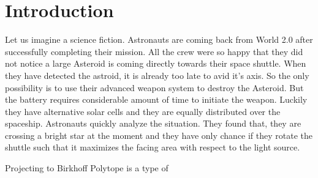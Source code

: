 
\chapter{Introduction} %

\label{ChapterX} %


Let us imagine a science fiction. Astronauts are coming back from World 2.0 after successfully completing their mission. All the crew were so happy that they did not notice a large Asteroid is coming directly towards their space shuttle. When they have detected the astroid, it is already too late to avid it's axis. So the only possibility is to use their advanced weapon system to destroy the Asteroid. But the battery requires considerable amount of time to initiate the weapon. Luckily they have alternative solar cells and they are equally distributed over the spaceship. Astronauts quickly analyze the situation. They found that, they are crossing a bright star at the moment and they have only chance if they rotate the shuttle such that it maximizes the facing area with respect to the light source.































Projecting to Birkhoff Polytope is a type of 


